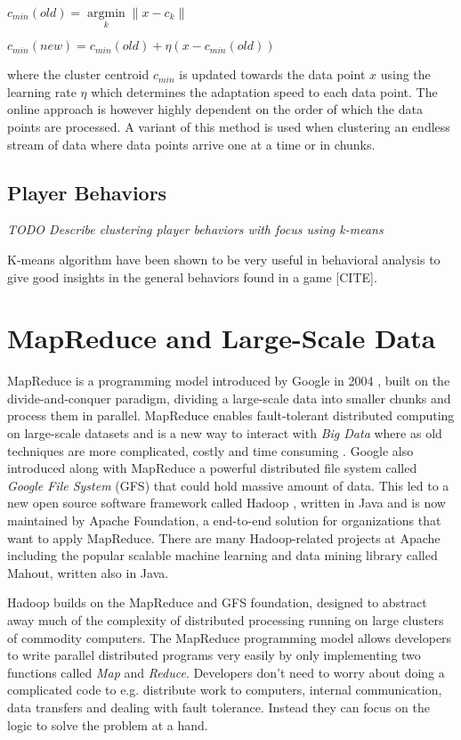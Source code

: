 \begin{center}
$c_{min}(old) = \underset{k}{\operatorname{argmin}} \|x-c_k\|$

$c_{min}(new) = c_{min}(old)+\eta(x-c_{min}(old))$
\end{center}

where the cluster centroid $c_{min}$ is updated towards the data point $x$ using the learning rate $\eta$ which determines the adaptation speed to each data point. The online approach is however highly dependent on the order of which the data points are processed. A variant of this method is used when clustering an endless stream of data where data points arrive one at a time or in chunks.


\subsection{Player Behaviors}
\textit{TODO Describe clustering player behaviors with focus using k-means}

K-means algorithm have been shown to be very useful in behavioral analysis to give good insights in the general behaviors found in a game [CITE].

\lipsum[6]


\section{MapReduce and Large-Scale Data}
MapReduce is a programming model introduced by Google in 2004 \citep{Dean:2004}, built on the divide-and-conquer paradigm, dividing a large-scale data into smaller chunks and process them in parallel. MapReduce enables fault-tolerant distributed computing on large-scale datasets and is a new way to interact with \textit{Big Data} where as old techniques are more complicated, costly and time consuming \citep{Dean:2004}. Google also introduced along with MapReduce a powerful distributed file system called \textit{Google File System} (GFS) that could hold massive amount of data. This led to a new open source software framework called Hadoop \citep{bialecki2005hadoop}, written in Java and is now maintained by Apache Foundation, a end-to-end solution for organizations that want to apply MapReduce. There are many Hadoop-related projects at Apache including the popular scalable machine learning and data mining library called Mahout, written also in Java. 

Hadoop builds on the MapReduce and GFS foundation, designed to abstract away much of the complexity of distributed processing running on large clusters of commodity computers. The MapReduce programming model allows developers to write parallel distributed programs very easily by only implementing two functions called \textit{Map} and \textit{Reduce}. Developers don't need to worry about doing a complicated code to e.g. distribute work to computers, internal communication, data transfers and dealing with fault tolerance. Instead they can focus on the logic to solve the problem at a hand.

